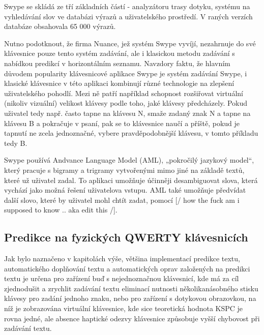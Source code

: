 \documentclass[a4paper,11pt]{article}
\newcommand{\td}[2][]{
	{\todo[size=\footnotesize]{#2}}
}
\begin{document}
Swype se skládá ze tří základních částí - analyzátoru trasy dotyku, systému na vyhledávání slov ve databázi výrazů a uživatelského prostředí. V raných verzích databáze obsahovala\td{damn.. tady mi zase utekla citace nekam do haje} 65 000 výrazů.

Nutno podotknout, že firma Nuance, jež systém Swype vyvíjí, nezahrnuje do své klávesnice pouze tento systém zadávání, ale i klasickou metodu zadávání s nabídkou predikcí v horizontálním seznamu. Navzdory faktu, že hlavním důvodem popularity klávesnicové aplikace Swype je systém zadávání Swype, i klasické klávesnice v této aplikaci kombinují různé technologie na zlepšení uživatelského pohodlí. Mezi ně patří například schopnost rozšiřovat virtuální (nikoliv vizuální) velikost klávesy podle toho, jaké klávesy předcházely. Pokud uživatel tedy např. často tapne na klávesu N, smaže zadaný znak N a tapne na klávesu B a pokračuje v psaní, pak se to klávesnice naučí a příště, pokud je tapnutí ne zcela jednoznačné, vybere pravděpodobnější klávesu, v tomto příkladu tedy B. %


Swype používá Andvance Language Model (AML), „pokročilý jazykový model“, který pracuje s bigramy a trigramy vytvořenými mimo jiné na základě textů, které už uživatel zadal. To aplikaci umožňuje účinněji desambiguovat slova, která vychází jako možná řešení uživatelova vstupu. AML také umožňuje předvídat další slovo, které by uživatel mohl chtít zadat, pomocí [/ how the fuck am i supposed to know .. aka edit this /].

\subsection{Predikce na fyzických QWERTY klávesnicích}

Jak bylo naznačeno v kapitolách výše, většina implementací predikce textu, automatického doplňování textu a automatických oprav založených na predikci textu je určena pro zařízení buď s nejednoznačnou klávesnicí, kde má za cíl zjednodušit a zrychlit zadávání textu eliminací nutnosti několikanásobného stisku klávesy pro zadání jednoho znaku, nebo pro zařízení s dotykovou obrazovkou, na níž je zobrazována virtuální klávesnice, kde sice teoretická hodnota KSPC je rovna jedné, ale absence haptické odezvy klávesnice způsobuje vyšší chybovost při zadávání textu. 
\end{document}
